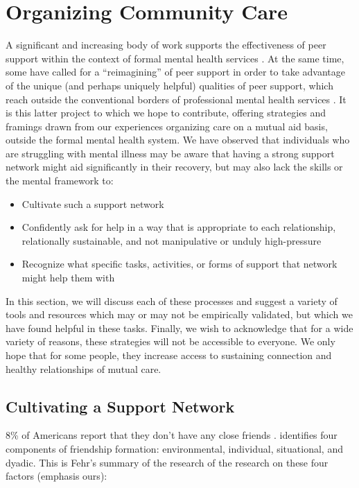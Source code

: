 \documentclass[12pt,letterpaper]{book}
\begin{document}
\section{Organizing Community Care}
\label{sec:organizingcare}
A significant and increasing body of work supports the effectiveness of peer support within the context of formal mental health services \cite{shalaby2020peer}. At the same time, some have called for a “reimagining” of peer support in order to take advantage of the unique (and perhaps uniquely helpful) qualities of peer support, which reach outside the conventional borders of professional mental health services \cite{gillard2019peer}. It is this latter project to which we hope to contribute, offering strategies and framings drawn from our experiences organizing care on a mutual aid basis, outside the formal mental health system. We have observed that individuals who are struggling with mental illness may be aware that having a strong support network might aid significantly in their recovery, but may also lack the skills or the mental framework to:
\begin{itemize}
	\item Cultivate such a support network
	\item Confidently ask for help in a way that is appropriate to each relationship, relationally sustainable, and not manipulative or unduly high-pressure
	\item Recognize what specific tasks, activities, or forms of support that network might help them with
\end{itemize}

In this section, we will discuss each of these processes and suggest a variety of tools and resources which may or may not be empirically validated, but which we have found helpful in these tasks. Finally, we wish to acknowledge that for a wide variety of reasons, these strategies will not be accessible to everyone. We only hope that for some people, they increase access to sustaining connection and healthy relationships of mutual care.

\subsection*{Cultivating a Support Network}

8\% of Americans report that they don't have any close friends \cite{pewFriends}. \textcite{fehr2008friendship} identifies four components of friendship formation: environmental, individual, situational, and dyadic. This is Fehr's summary of the research of the research on these four factors (emphasis ours):
\end{document}
